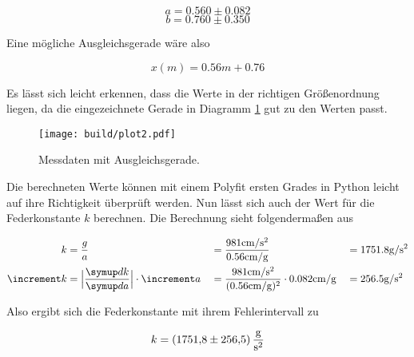\begin{equation}
a = 0.560 \pm 0.082
\end{equation}
\begin{equation}
b = 0.760 \pm 0.350
\end{equation}
\begin{flushleft}
Eine mögliche Ausgleichsgerade wäre also
\end{flushleft}
\begin{equation}
x(m) = 0.56m + 0.76
\end{equation}
\begin{flushleft}
Es lässt sich leicht erkennen, dass die Werte in der richtigen Größenordnung liegen, da die eingezeichnete Gerade in Diagramm \ref{fig:plot2} gut zu den Werten passt. 
\end{flushleft}
\begin{figure}
  \centering
  \texttt{[image: build/plot2.pdf]}
  \caption{Messdaten mit Ausgleichsgerade.}
  \label{fig:plot2}
\end{figure}
\begin{flushleft}
Die berechneten Werte können mit einem Polyfit ersten Grades in Python leicht auf ihre Richtigkeit überprüft werden.
Nun lässt sich auch der Wert für die Federkonstante $k$ berechnen. Die Berechnung sieht folgendermaßen aus
\end{flushleft}
\begin{align}
k &= \frac{g}{a} &&= \frac{981\si[per-mode=symbol]{\centi\meter\per\second\squared}}{0.56\si[per-mode=symbol]{\centi\meter\per\gram}} &&= 1751.8\si[per-mode=symbol]{\gram\per\second\squared} \\
\increment k &= \Bigl| \frac{\dif{k}}{\dif{a}} \Bigr| \cdot \increment a &&= \frac{981\si[per-mode=symbol]{\centi\meter\per\second\squared}}{(0.56\si[per-mode=symbol]{\centi\meter\per\gram})^2} \cdot 0.082\si[per-mode=symbol]{\centi\meter\per\gram} &&=  256.5\si[per-mode=symbol]{\gram\per\second\squared}
\end{align}
\begin{flushleft}
Also ergibt sich die Federkonstante mit ihrem Fehlerintervall zu
\end{flushleft}
\begin{equation}
k = \SI{1751{,}8(2565)}{\gram\per\second\squared}
\end{equation}


